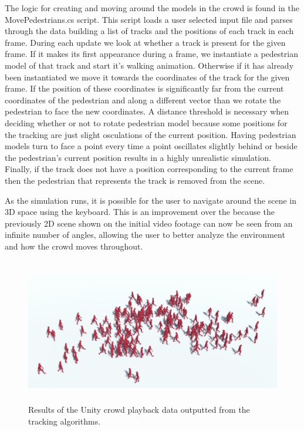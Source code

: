 \documentclass[12pt, onecolumn, conference]{IEEEtran}
\begin{document}
The logic for creating and moving around the models in the crowd is found in the MovePedestrians.cs script. This script loads a user selected input file and parses through the data building a list of tracks and the positions of each track in each frame. During each update we look at whether a track is present for the given frame. If it makes its first appearance during a frame, we instantiate a pedestrian model of that track and start it's walking animation. Otherwise if it has already been instantiated we move it towards the coordinates of the track for the given frame. If the position of these coordinates is significantly far from the current coordinates of the pedestrian and along a different vector than  we rotate the pedestrian to face the new coordinates. A distance threshold is necessary when deciding whether or not to rotate pedestrian model because some positions for the tracking are just slight osculations of the current position. Having pedestrian models turn to face a point every time a point oscillates slightly behind or beside the pedestrian's current position results in a highly unrealistic simulation. Finally, if the track does not have a position corresponding to the current frame then the pedestrian that represents the track is removed from the scene. 

As the simulation runs, it is possible for the user to navigate around the scene in 3D space using the keyboard. This is an improvement over the because the previously 2D scene shown on the initial video footage can now be seen from an infinite number of angles, allowing the user to better analyze the environment and how the crowd moves throughout.

\begin{figure}[!t]
\centering
\includegraphics[height=2.5in]{Screenshots/Capture4.JPG}
\caption{Results of the Unity crowd playback data outputted from the tracking algorithms.}
\label{Unity}
\end{figure}
\end{document}

